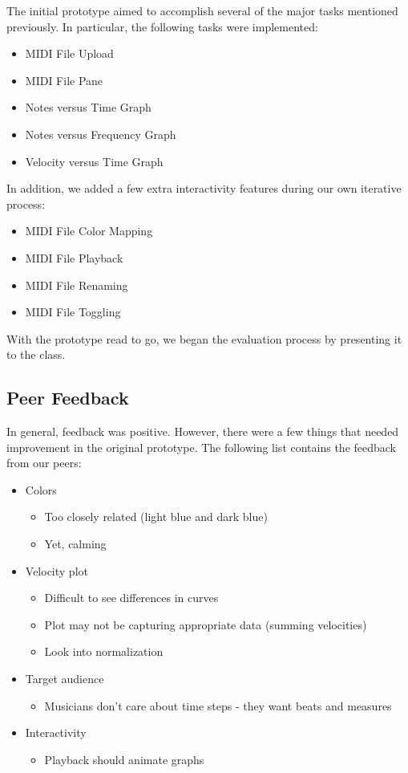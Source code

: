 \documentclass[journal]{vgtc}                %
\begin{document}
The initial prototype aimed to accomplish several of the major tasks mentioned
previously. In particular, the following tasks were implemented:

\begin{itemize}
  \item MIDI File Upload
  \item MIDI File Pane
  \item Notes versus Time Graph
  \item Notes versus Frequency Graph
  \item Velocity versus Time Graph
\end{itemize}

In addition, we added a few extra interactivity features during our own
iterative process:

\begin{itemize}
  \item MIDI File Color Mapping
  \item MIDI File Playback
  \item MIDI File Renaming
  \item MIDI File Toggling
\end{itemize}

With the prototype read to go, we began the evaluation process by presenting
it to the class.

\subsection{Peer Feedback}

In general, feedback was positive. However, there were a few things
that needed improvement in the original prototype. The following
list contains the feedback from our peers:

\begin{itemize}
  \item Colors
  \begin{itemize}
    \item Too closely related (light blue and dark blue)
    \item Yet, calming
  \end{itemize}
  \item Velocity plot
  \begin{itemize}
    \item Difficult to see differences in curves
    \item Plot may not be capturing appropriate data (summing velocities)
    \item Look into normalization
  \end{itemize}
  \item Target audience
  \begin{itemize}
    \item Musicians don't care about time steps - they want beats and measures
  \end{itemize}
  \item Interactivity
  \begin{itemize}
    \item Playback should animate graphs
  \end{itemize}
\end{itemize}
\end{document}

